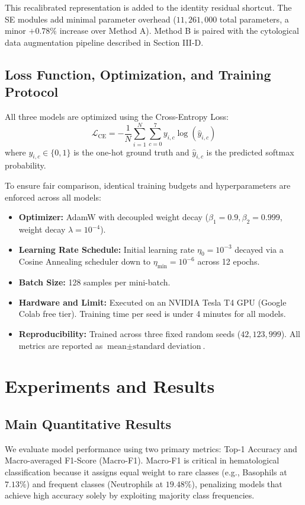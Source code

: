 \documentclass[conference]{IEEEtran}
\begin{document}
This recalibrated representation is added to the identity residual shortcut. The SE modules add minimal parameter overhead ($11,261,000$ total parameters, a minor $+0.78\%$ increase over Method A). Method B is paired with the cytological data augmentation pipeline described in Section III-D.

\subsection{Loss Function, Optimization, and Training Protocol}
All three models are optimized using the Cross-Entropy Loss:
\begin{equation}
\mathcal{L}_{\text{CE}} = - \frac{1}{N} \sum_{i=1}^{N} \sum_{c=0}^{7} y_{i, c} \log(\hat{y}_{i, c})
\end{equation}
where $y_{i, c} \in \{0, 1\}$ is the one-hot ground truth and $\hat{y}_{i, c}$ is the predicted softmax probability.

To ensure fair comparison, identical training budgets and hyperparameters are enforced across all models:
\begin{itemize}
    \item \textbf{Optimizer:} AdamW with decoupled weight decay ($\beta_1 = 0.9, \beta_2 = 0.999$, weight decay $\lambda = 10^{-4}$).
    \item \textbf{Learning Rate Schedule:} Initial learning rate $\eta_0 = 10^{-3}$ decayed via a Cosine Annealing scheduler down to $\eta_{\text{min}} = 10^{-6}$ across 12 epochs.
    \item \textbf{Batch Size:} 128 samples per mini-batch.
    \item \textbf{Hardware and Limit:} Executed on an NVIDIA Tesla T4 GPU (Google Colab free tier). Training time per seed is under 4 minutes for all models.
    \item \textbf{Reproducibility:} Trained across three fixed random seeds ($42, 123, 999$). All metrics are reported as $\text{mean} \pm \text{standard deviation}$.
\end{itemize}

\section{Experiments and Results}

\subsection{Main Quantitative Results}
We evaluate model performance using two primary metrics: Top-1 Accuracy and Macro-averaged F1-Score (Macro-F1). Macro-F1 is critical in hematological classification because it assigns equal weight to rare classes (e.g., Basophils at $7.13\%$) and frequent classes (Neutrophils at $19.48\%$), penalizing models that achieve high accuracy solely by exploiting majority class frequencies.
\end{document}
